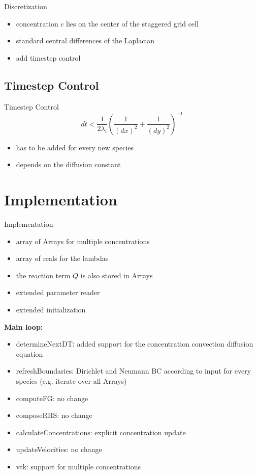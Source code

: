 \documentclass[t,mathserif]{beamer}
\begin{document}
\begin{frame}[allowframebreaks]{Discretization}
\begin{itemize}
	\item concentration $c$ lies on the center of the staggered grid cell
	\item standard central differences of the Laplacian
	\item add timestep control
\end{itemize}
\end{frame}

\subsection{Timestep Control}
\begin{frame}{Timestep Control}
	\begin{equation}
			dt < \frac{1}{2 \lambda_i} \left ( \frac{1}{(dx)^2} +
			\frac{1}{(dy)^2} \right ) ^{-1}
	\end{equation}
	\begin{itemize}
		\item has to be added for every new species
		\item depends on the diffusion constant
	\end{itemize}
\end{frame}


\section{Implementation}
\begin{frame}[allowframebreaks]{Implementation}
\begin{itemize}
	\item array of Arrays for multiple concentrations
	\item array of reals for the lambdas
	\item the reaction term $Q$ is also stored in Arrays
	\item extended parameter reader
	\item extended initialization
\end{itemize}
\framebreak
\textbf{Main loop:}
\begin{itemize}
	\item determineNextDT: added support for the concentration convection diffusion equation
    \item refreshBoundaries: Dirichlet and Neumann BC according to input for every species (e.g. iterate over all Arrays)
    \item computeFG: no change
    \item composeRHS: no change
    \item calculateConcentrations: explicit concentration update
    \item updateVelocities: no change
    \item vtk: support for multiple concentrations
\end{itemize}
\end{frame}
\end{document}
